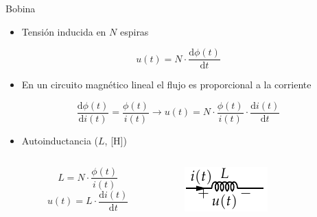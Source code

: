 \documentclass[xcolor={usenames,svgnames,dvipsnames}]{beamer}
\begin{document}
\begin{frame}[label={sec:org1ca188b}]{Bobina}
\begin{itemize}
\item Tensión inducida en \(N\) espiras
\end{itemize}
\[
u(t) = N \cdot \frac{\mathrm{d}\phi(t)}{\mathrm{d} t}
\]
\begin{itemize}
\item En un circuito magnético lineal el flujo es proporcional a la corriente
\end{itemize}
\[
  \frac{\mathrm{d}\phi(t)}{\mathrm{d} i(t)} = \frac{\phi(t)}{i(t)}
\rightarrow
u(t) = N \cdot \frac{\phi(t)}{i(t)} \cdot \frac{\mathrm{d}i(t)}{\mathrm{d} t}
\]

\begin{itemize}
\item Autoinductancia (\(L\), [H])
\end{itemize}
\begin{columns}
\begin{column}{0.5\columnwidth}
\[
  \boxed{L = N \cdot \frac{\phi(t)}{i(t)}}
\]
\[
  \boxed{u(t) = L \cdot \frac{\mathrm{d}i(t)}{\mathrm{d} t}}
\]
\end{column}
\begin{column}{0.5\columnwidth}
\begin{center}
\includegraphics[height=0.2\textheight]{figs/Bobina.pdf}
\end{center}
\end{column}
\end{columns}
\end{frame}
\end{document}
